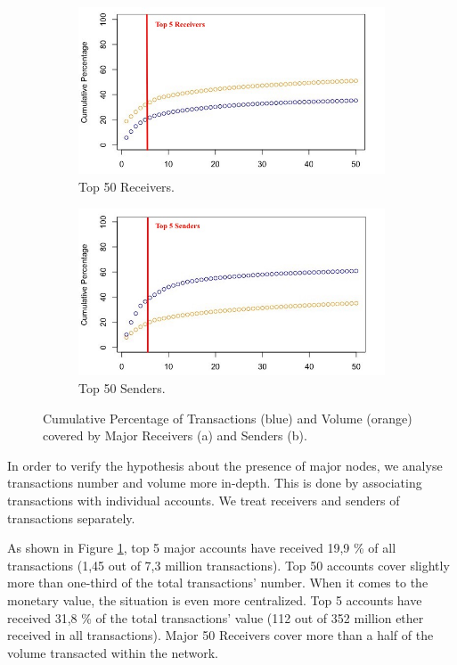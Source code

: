 \begin{figure}[h]
  \centering
  \begin{subfigure}[b]{0.49\linewidth}
    \includegraphics[width=\linewidth]{figures/major_receivers_metrics.jpeg}
    \caption{Top 50 Receivers.}
    \label{fig:major_receivers_metrics}
  \end{subfigure}
  \begin{subfigure}[b]{0.49\linewidth}
    \includegraphics[width=\linewidth]{figures/major_senders_metrics.jpeg}
    \caption{Top 50 Senders.}
    \label{fig:major_senders_metrics}
  \end{subfigure}
  \caption{Cumulative Percentage of Transactions (blue) and Volume (orange) covered by Major Receivers (a) and Senders (b).}
  \label{fig:major_metrics}
\end{figure}

In order to verify the hypothesis about the presence of major nodes, we analyse transactions number and volume more in-depth. 
This is done by associating transactions with individual accounts.
We treat receivers and senders of transactions separately.

As shown in Figure \ref{fig:major_receivers_metrics}, top 5 major accounts have received 19,9 \% of all transactions (1,45 out of 7,3 million transactions).
Top 50 accounts cover slightly more than one-third of the total transactions' number.
When it comes to the monetary value, the situation is even more centralized.
Top 5 accounts have received 31,8 \% of the total transactions' value (112 out of 352 million ether received in all transactions).
Major 50 Receivers cover more than a half of the volume transacted within the network. 

